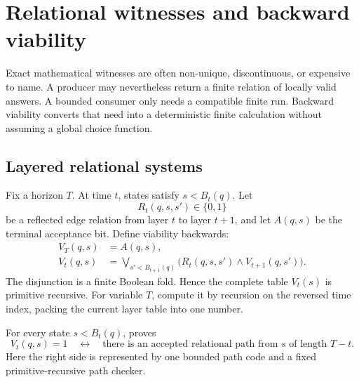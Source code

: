\section{Relational witnesses and backward viability}
\label{sec:viability}

Exact mathematical witnesses are often non-unique, discontinuous, or expensive to name.  A producer may nevertheless return a finite relation of locally valid answers.  A bounded consumer only needs a compatible finite run.  Backward viability converts that need into a deterministic finite calculation without assuming a global choice function.

\subsection{Layered relational systems}

Fix a horizon \(T\).  At time \(t\), states satisfy \(s<B_t(q)\).  Let
\[
  R_t(q,s,s')\in\{0,1\}
\]
be a reflected edge relation from layer \(t\) to layer \(t+1\), and let \(A(q,s)\) be the terminal acceptance bit.  Define viability backwards:
\begin{align}
 V_T(q,s)&=A(q,s),\label{eq:viable-terminal}\\
 V_t(q,s)&=\bigvee_{s'<B_{t+1}(q)}
   \bigl(R_t(q,s,s')\wedge V_{t+1}(q,s')\bigr).
 \label{eq:viable-backward}
\end{align}
The disjunction is a finite Boolean fold.  Hence the complete table \(V_t(s)\) is primitive recursive.  For variable \(T\), compute it by recursion on the reversed time index, packing the current layer table into one number.

\begin{theorem}
\label{thm:viability-correct}
For every state \(s<B_t(q)\), \iPRA{} proves
\begin{equation}
 V_t(q,s)=1
 \quad\leftrightarrow\quad
 \text{there is an accepted relational path from \(s\) of length \(T-t\)}.
 \label{eq:viability-path-equivalence}
\end{equation}
Here the right side is represented by one bounded path code and a fixed primitive-recursive path checker.
\end{theorem}

